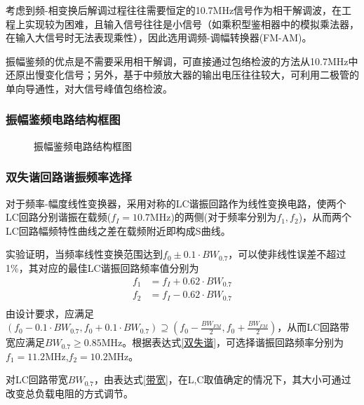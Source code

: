 \documentclass[a4paper,12pt,twoside]{article}
\begin{document}
考虑到频-相变换后解调过程往往需要恒定的10.7MHz信号作为相干解调波，在工程上实现较为困难，且输入信号往往是小信号（如乘积型鉴相器中的模拟乘法器，在输入大信号时无法表现乘性），因此选用调频-调幅转换器(FM-AM)。

振幅鉴频的优点是不需要采用相干解调，可直接通过包络检波的方法从10.7MHz中还原出慢变化信号；另外，基于中频放大器的输出电压往往较大，可利用二极管的单向导通性，对大信号峰值包络检波。

\subsubsection{振幅鉴频电路结构框图}
\begin{figure}[H]
    \centering
    \caption{振幅鉴频电路结构框图}
\end{figure}

\subsubsection{双失谐回路谐振频率选择}
对于频率-幅度线性变换器，采用对称的LC谐振回路作为线性变换电路，使两个LC回路分别谐振在载频($f_{I}=10.7$MHz)的两侧(对于频率分别为$f_{1},f_{2}$)，从而两个LC回路幅频特性曲线之差在载频附近即构成S曲线。

实验证明，当频率线性变换范围达到$f_0\pm  0.1\cdot BW_{0.7}$，可以使非线性误差不超过1\%，其对应的最佳LC谐振回路频率值分别为
\begin{equation}
    \begin{aligned}
    f_{1}&=f_{I}+0.62\cdot BW_{0.7}\\
    f_{2}&=f_{I}-0.62\cdot BW_{0.7}\\
    \end{aligned}
    \label{双失谐}
\end{equation}
由设计要求，应满足$(f_0-0.1\cdot BW_{0.7},f_0+0.1\cdot BW_{0.7})\supseteq  (f_0-\frac{BW_{FM}}{2},f_0+\frac{BW_{FM}}{2})$，从而LC回路带宽应满足$BW_{0.7}\ge 0.85$MHz。根据表达式\ref{双失谐}，可选择谐振回路频率分别为$f_1=11.2$MHz,$f_2=10.2$MHz。

对LC回路带宽$BW_{0.7}$，由表达式\ref{带宽}，在L,C取值确定的情况下，其大小可通过改变总负载电阻的方式调节。
\end{document}
